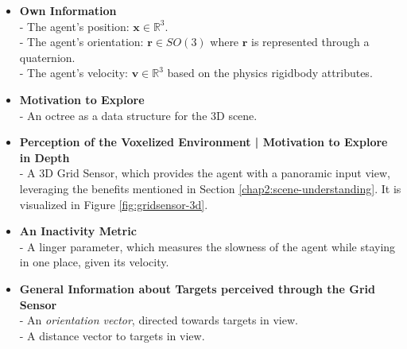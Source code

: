 \begin{itemize}
    \item \textbf{Own Information}
        \\ - The agent’s position: $\mathbf{x} \in \mathbb{R}^3$.
        \\ - The agent’s orientation: $\mathbf{r} \in SO(3)$ where $\textbf{r}$ is represented through a quaternion.
        \\ - The agent's velocity: $\mathbf{v} \in \mathbb{R}^3$ based on the physics rigidbody attributes.
    
    \item \textbf{Motivation to Explore}
    \\ - An octree as a data structure for the 3D scene.
    
    \item \textbf{Perception of the Voxelized Environment | Motivation to Explore in Depth}
    \\ - A 3D Grid Sensor, which provides the agent with a panoramic input view, leveraging the benefits mentioned in Section \ref{chap2:scene-understanding}. It is visualized in Figure \ref{fig:gridsensor-3d}.

    
    \item \textbf{An Inactivity Metric}
    \\ - A linger parameter, which measures the slowness of the agent while staying in one place, given its velocity.
    
    \item \textbf{General Information about Targets perceived through the Grid Sensor}
    \\ - An \textit{orientation vector}, directed towards targets in view.
    \\ - A distance vector to targets in view.

\end{itemize}

